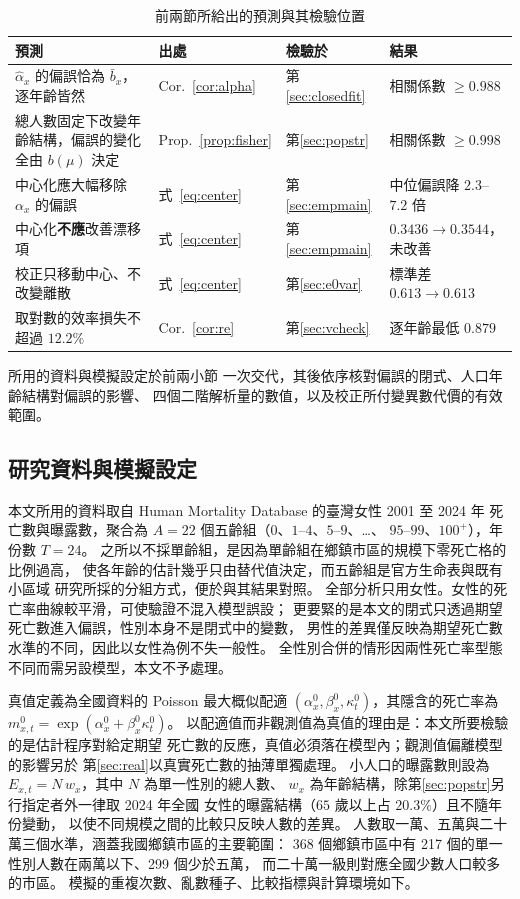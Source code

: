 \documentclass[UTF8, fontset=macnew, a4paper, 12pt]{ctexart}
\begin{document}
\begin{table}[H]
\centering
\caption{前兩節所給出的預測與其檢驗位置}
\footnotesize
\begin{tabular}{llll}
\toprule
預測 & 出處 & 檢驗於 & 結果\\
\midrule
$\hat\alpha_x$ 的偏誤恰為 $\bar b_x$，逐年齡皆然
  & Cor.~\ref{cor:alpha} & 第\ref{sec:closedfit} & 相關係數 $\ge0.988$\\
總人數固定下改變年齡結構，偏誤的變化全由 $b(\mu)$ 決定
  & Prop.~\ref{prop:fisher} & 第\ref{sec:popstr} & 相關係數 $\ge0.998$\\
中心化應大幅移除 $\alpha_x$ 的偏誤
  & 式~\eqref{eq:center} & 第\ref{sec:empmain} & 中位偏誤降 $2.3$--$7.2$ 倍\\
中心化\textbf{不應}改善漂移項
  & 式~\eqref{eq:center} & 第\ref{sec:empmain} & $0.3436\to0.3544$，未改善\\
校正只移動中心、不改變離散
  & 式~\eqref{eq:center} & 第\ref{sec:e0var} & 標準差 $0.613\to0.613$\\
取對數的效率損失不超過 $12.2\%$
  & Cor.~\ref{cor:re} & 第\ref{sec:vcheck} & 逐年齡最低 $0.879$\\
\bottomrule
\end{tabular}
\label{tab:pred}
\end{table}

所用的資料與模擬設定於前兩小節
一次交代，其後依序核對偏誤的閉式、人口年齡結構對偏誤的影響、
四個二階解析量的數值，以及校正所付變異數代價的有效範圍。

\subsection{研究資料與模擬設定}\label{subsec:data}\label{sec:setup}

本文所用的資料取自 Human Mortality Database 的臺灣女性 2001 至 2024 年
死亡數與曝露數，聚合為 $A=22$ 個五齡組（$0$、$1$--$4$、$5$--$9$、\dots、
$95$--$99$、$100^{+}$），年份數 $T=24$。
之所以不採單齡組，是因為單齡組在鄉鎮市區的規模下零死亡格的比例過高，
使各年齡的估計幾乎只由替代值決定，而五齡組是官方生命表與既有小區域
研究所採的分組方式，便於與其結果對照。
全部分析只用女性。女性的死亡率曲線較平滑，可使驗證不混入模型誤設；
更要緊的是本文的閉式只透過期望死亡數進入偏誤，性別本身不是閉式中的變數，
男性的差異僅反映為期望死亡數水準的不同，因此以女性為例不失一般性。
全性別合併的情形因兩性死亡率型態不同而需另設模型，本文不予處理。

真值定義為全國資料的 Poisson 最大概似配適
$(\alpha^{0}_x,\beta^{0}_x,\kappa^{0}_t)$，其隱含的死亡率為
$m^{0}_{x,t}=\exp(\alpha^{0}_x+\beta^{0}_x\kappa^{0}_t)$。
以配適值而非觀測值為真值的理由是：本文所要檢驗的是估計程序對給定期望
死亡數的反應，真值必須落在模型內；觀測值偏離模型的影響另於
第\ref{sec:real}以真實死亡數的抽薄單獨處理。
小人口的曝露數則設為 $E_{x,t}=N\,w_x$，其中 $N$ 為單一性別的總人數、
$w_x$ 為年齡結構，除第\ref{sec:popstr}另行指定者外一律取 2024 年全國
女性的曝露結構（$65$ 歲以上占 $20.3\%$）且不隨年份變動，
以使不同規模之間的比較只反映人數的差異。
人數取一萬、五萬與二十萬三個水準，涵蓋我國鄉鎮市區的主要範圍：
368 個鄉鎮市區中有 217 個的單一性別人數在兩萬以下、299 個少於五萬，
而二十萬一級則對應全國少數人口較多的市區。
模擬的重複次數、亂數種子、比較指標與計算環境如下。
\end{document}
